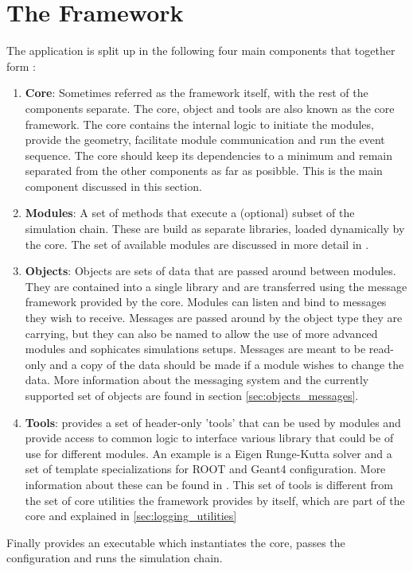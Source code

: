 \section{The \apsq Framework}
The application is split up in the following four main components that together form \apsq:
\begin{enumerate}
\item \textbf{Core}: Sometimes referred as the framework itself, with the rest of the components separate. The core, object and tools are also known as the core framework. The core contains the internal logic to initiate the modules, provide the geometry, facilitate module communication and run the event sequence. The core should keep its dependencies to a minimum and remain separated from the other components as far as posibble. This is the main component discussed in this section.
\item \textbf{Modules}: A set of methods that execute a (optional) subset of the simulation chain. These are build as separate libraries, loaded dynamically by the core. The set of available modules are discussed in more detail in \needref.
\item \textbf{Objects}: Objects are sets of data that are passed around between modules. They are contained into a single library and are transferred using the message framework provided by the core. Modules can listen and bind to messages they wish to receive. Messages are passed around by the object type they are carrying, but they can also be named to allow the use of more advanced modules and sophicates simulations setups. Messages are meant to be read-only and a copy of the data should be made if a module wishes to change the data. More information about the messaging system and the currently supported set of objects are found in section \ref{sec:objects_messages}.
\item \textbf{Tools}: \apsq provides a set of header-only 'tools' that can be used by modules and provide access to common logic to interface various library that could be of use for different modules. An example is a Eigen Runge-Kutta solver and a set of template specializations for ROOT and Geant4 configuration. More information about these can be found in \needref. This set of tools is different from the set of core utilities the framework provides by itself, which are part of the core and explained in \ref{sec:logging_utilities}
\end{enumerate}
Finally \apsq provides an executable which instantiates the core, passes the configuration and runs the simulation chain.

